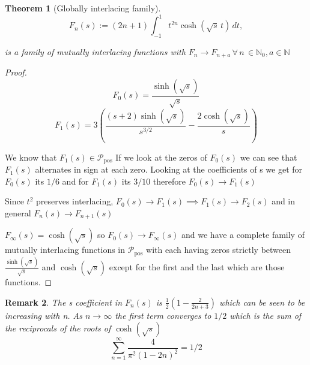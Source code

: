 \documentclass[11pt]{article}
\theoremstyle{breakdef}
\newtheorem{theorem}{Theorem}[section]
\newtheorem{remark}[theorem]{Remark}
\begin{document}
\begin{theorem}[Globally interlacing family]
\begin{equation}
F_n(s):=(2n+1)\int_{-1}^1 t^{2n}\cosh(\sqrt{s}\,t)\,dt,
\end{equation}

is a family of mutually interlacing functions with 
$F_{n} \to F_{n+a} \, \forall \, n \,\in \mathbb{N}_0, a \in \mathbb{N} $
\end{theorem}
\begin{proof}
\begin{equation}
F_0(s) = \frac{\sinh \left(\sqrt{s}\right)}{\sqrt{s}}
\end{equation}
\begin{equation}
F_1(s) =  3 \left(\frac{(s+2) \sinh \left(\sqrt{s}\right)}{s^{3/2}}-\frac{2 \cosh \left(\sqrt{s}\right)}{s}\right)
\end{equation}

We know that $F_1(s) \in \mathcal{P}_{\mathrm{pos}}$ If we look at the zeros of $F_0(s)$ we can see that $F_1(s)$ alternates in sign at each zero.
Looking at the coefficients of s we get for $F_0(s)$ its $1/6$ and for $F_1(s)$ its  $3/10$ therefore $F_0(s) \to F_1(s)$

Since $t^2$ preserves interlacing, $F_0(s) \to F_1(s) \implies F_1(s) \to F_2(s)$ and in general $F_n(s) \to F_{n+1}(s)$

$F_{\infty}(s) = \cosh \left(\sqrt{s}\right) $ so $F_0(s) \to F_{\infty}(s)$ and we have a complete family of mutually interlacing functions in $\mathcal{P}_{\mathrm{pos}}$ with each having zeros strictly between 
$\frac{\sinh \left(\sqrt{s}\right)}{\sqrt{s}}$ and $\cosh \left(\sqrt{s}\right)$ except for the first and the last which are those functions.

\end{proof}

\begin{remark}
The s coefficient in $F_n(s)$ is $\frac{1}{2} \left(1-\frac{2}{2 n+3}\right)$ which can be seen to be increasing with n. As $ n \to \infty$ the first term converges to $1/2$ which is the sum of the reciprocals of the roots of $\cosh \left(\sqrt{s}\right)$
\begin{equation}
\sum _{n=1}^{\infty } \frac{4}{\pi ^2 (1-2 n)^2} = 1/2
\end{equation}

\end{remark}
\end{document}
